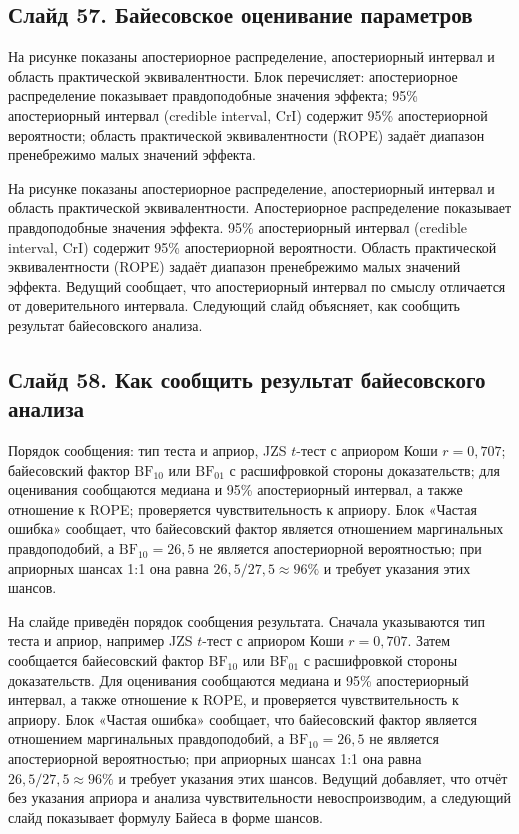 \documentclass[11pt,a4paper]{article}
\begin{document}
\subsection*{Слайд 57. Байесовское оценивание параметров}
\begin{onslide}
На рисунке показаны апостериорное распределение, апостериорный интервал и область практической эквивалентности. Блок перечисляет: апостериорное распределение показывает правдоподобные значения эффекта; 95\% апостериорный интервал (credible interval, CrI) содержит 95\% апостериорной вероятности; область практической эквивалентности (ROPE) задаёт диапазон пренебрежимо малых значений эффекта.
\end{onslide}
На рисунке показаны апостериорное распределение, апостериорный интервал и область практической эквивалентности. Апостериорное распределение показывает правдоподобные значения эффекта. 95\% апостериорный интервал (credible interval, CrI) содержит 95\% апостериорной вероятности. Область практической эквивалентности (ROPE) задаёт диапазон пренебрежимо малых значений эффекта. Ведущий сообщает, что апостериорный интервал по смыслу отличается от доверительного интервала. Следующий слайд объясняет, как сообщить результат байесовского анализа.

\subsection*{Слайд 58. Как сообщить результат байесовского анализа}
\begin{onslide}
Порядок сообщения: тип теста и априор, JZS $t$-тест с априором Коши $r = 0{,}707$; байесовский фактор $\mathrm{BF}_{10}$ или $\mathrm{BF}_{01}$ с расшифровкой стороны доказательств; для оценивания сообщаются медиана и 95\% апостериорный интервал, а также отношение к ROPE; проверяется чувствительность к априору. Блок «Частая ошибка» сообщает, что байесовский фактор является отношением маргинальных правдоподобий, а $\mathrm{BF}_{10}=26{,}5$ не является апостериорной вероятностью; при априорных шансах 1:1 она равна $26{,}5/27{,}5\approx96\%$ и требует указания этих шансов.
\end{onslide}
На слайде приведён порядок сообщения результата. Сначала указываются тип теста и априор, например JZS $t$-тест с априором Коши $r = 0{,}707$. Затем сообщается байесовский фактор $\mathrm{BF}_{10}$ или $\mathrm{BF}_{01}$ с расшифровкой стороны доказательств. Для оценивания сообщаются медиана и 95\% апостериорный интервал, а также отношение к ROPE, и проверяется чувствительность к априору. Блок «Частая ошибка» сообщает, что байесовский фактор является отношением маргинальных правдоподобий, а $\mathrm{BF}_{10}=26{,}5$ не является апостериорной вероятностью; при априорных шансах 1:1 она равна $26{,}5/27{,}5\approx96\%$ и требует указания этих шансов. Ведущий добавляет, что отчёт без указания априора и анализа чувствительности невоспроизводим, а следующий слайд показывает формулу Байеса в форме шансов.
\end{document}
